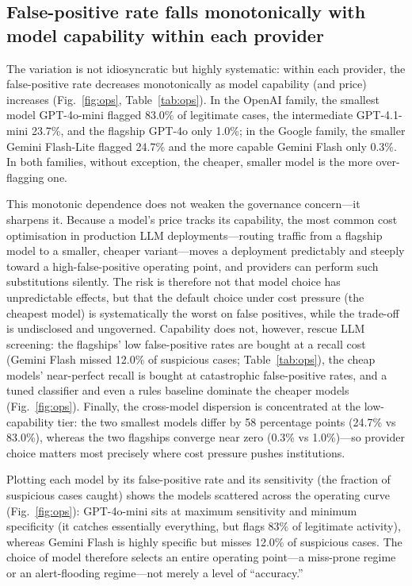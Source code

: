 \documentclass[lineno,pdflatex,sn-basic,Numbered]{sn-jnl}
\begin{document}
\subsection{False-positive rate falls monotonically with model capability within each provider}\label{sec:nonmono}

The variation is not idiosyncratic but highly systematic: within each provider, the false-positive rate decreases monotonically as model capability (and price) increases (Fig.~\ref{fig:ops}, Table~\ref{tab:ops}). In the OpenAI family, the smallest model GPT-4o-mini flagged 83.0\% of legitimate cases, the intermediate GPT-4.1-mini 23.7\%, and the flagship GPT-4o only 1.0\%; in the Google family, the smaller Gemini Flash-Lite flagged 24.7\% and the more capable Gemini Flash only 0.3\%. In both families, without exception, the cheaper, smaller model is the more over-flagging one.

This monotonic dependence does not weaken the governance concern---it sharpens it. Because a model's price tracks its capability, the most common cost optimisation in production LLM deployments---routing traffic from a flagship model to a smaller, cheaper variant---moves a deployment predictably and steeply toward a high-false-positive operating point, and providers can perform such substitutions silently. The risk is therefore not that model choice has unpredictable effects, but that the default choice under cost pressure (the cheapest model) is systematically the worst on false positives, while the trade-off is undisclosed and ungoverned. Capability does not, however, rescue LLM screening: the flagships' low false-positive rates are bought at a recall cost (Gemini Flash missed 12.0\% of suspicious cases; Table~\ref{tab:ops}), the cheap models' near-perfect recall is bought at catastrophic false-positive rates, and a tuned classifier and even a rules baseline dominate the cheaper models (Fig.~\ref{fig:ops}). Finally, the cross-model dispersion is concentrated at the low-capability tier: the two smallest models differ by 58 percentage points (24.7\% vs 83.0\%), whereas the two flagships converge near zero (0.3\% vs 1.0\%)---so provider choice matters most precisely where cost pressure pushes institutions.

Plotting each model by its false-positive rate and its sensitivity (the fraction of suspicious cases caught) shows the models scattered across the operating curve (Fig.~\ref{fig:ops}): GPT-4o-mini sits at maximum sensitivity and minimum specificity (it catches essentially everything, but flags 83\% of legitimate activity), whereas Gemini Flash is highly specific but misses 12.0\% of suspicious cases. The choice of model therefore selects an entire operating point---a miss-prone regime or an alert-flooding regime---not merely a level of ``accuracy.''
\end{document}
